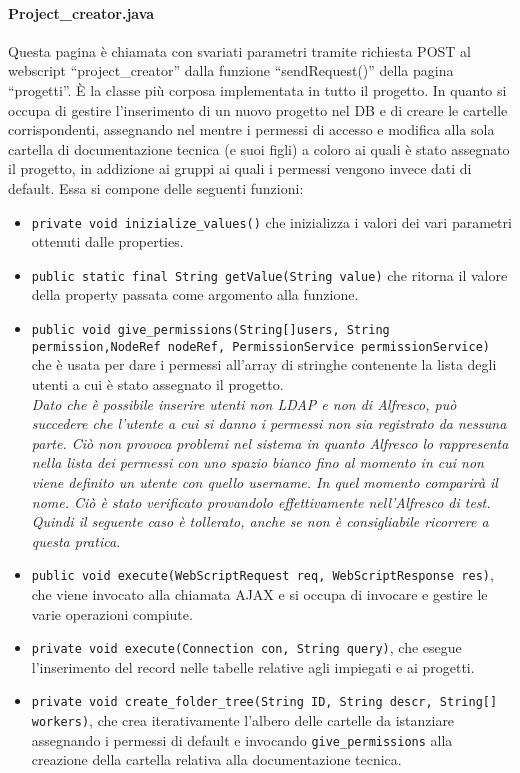 \paragraph{Project\_creator.java}
Questa pagina è chiamata con svariati parametri tramite richiesta POST al webscript “project\_creator” dalla funzione “sendRequest()” della pagina “progetti”. È la classe più corposa implementata in tutto il progetto. In quanto si occupa di gestire l’inserimento di un nuovo progetto nel DB e di creare le cartelle corrispondenti, assegnando nel mentre i permessi di accesso e modifica alla sola cartella di documentazione tecnica (e suoi figli) a coloro ai quali è stato assegnato il progetto, in addizione ai gruppi ai quali i permessi vengono invece dati di default.
Essa si compone delle seguenti funzioni:
\begin{itemize}
\item \texttt{private void inizialize\_values()} che inizializza i valori dei vari parametri ottenuti dalle properties.
\item \texttt{public static final String getValue(String value)} che ritorna il valore della property passata come argomento alla funzione.
\item \texttt{public void give\_permissions(String[]users, String permission,NodeRef nodeRef, PermissionService permissionService)} che è usata per dare i permessi all’array di stringhe contenente la lista degli utenti a cui è stato assegnato il progetto.\\
\emph{Dato che è possibile inserire utenti non LDAP e non di Alfresco, può succedere che l’utente a cui si danno i permessi non sia registrato da nessuna parte. Ciò non provoca problemi nel sistema in quanto Alfresco lo rappresenta nella lista dei permessi con uno spazio bianco fino al momento in cui non viene definito un utente con quello username. In quel momento comparirà il nome. Ciò è stato verificato provandolo effettivamente nell’Alfresco di test. Quindi il seguente caso è tollerato, anche se non è consigliabile ricorrere a questa pratica.}
\item \texttt{public void execute(WebScriptRequest req, WebScriptResponse res)}, che viene invocato alla chiamata AJAX e si occupa di invocare e gestire le varie operazioni compiute.
\item \texttt{private void execute(Connection con, String query)}, che esegue l’inserimento del record nelle tabelle relative agli impiegati e ai progetti.
\item \texttt{private void create\_folder\_tree(String ID, String descr, String[] workers)}, che crea iterativamente l’albero delle cartelle da istanziare assegnando i permessi di default e invocando \texttt{give\_permissions} alla creazione della cartella relativa alla documentazione tecnica.
\end{itemize}
